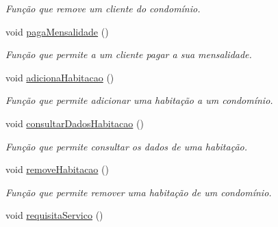 \begin{DoxyCompactItemize}
\begin{DoxyCompactList}\small\item\em Função que remove um cliente do condomínio. \end{DoxyCompactList}\item 
void \hyperlink{class_interface_aaad57b1cee2e56f7468b29522ff26822}{paga\+Mensalidade} ()\hypertarget{class_interface_aaad57b1cee2e56f7468b29522ff26822}{}\label{class_interface_aaad57b1cee2e56f7468b29522ff26822}

\begin{DoxyCompactList}\small\item\em Função que permite a um cliente pagar a sua mensalidade. \end{DoxyCompactList}\item 
void \hyperlink{class_interface_a1cb89458dd7b90cd1b0b52ad429dd898}{adiciona\+Habitacao} ()\hypertarget{class_interface_a1cb89458dd7b90cd1b0b52ad429dd898}{}\label{class_interface_a1cb89458dd7b90cd1b0b52ad429dd898}

\begin{DoxyCompactList}\small\item\em Função que permite adicionar uma habitação a um condomínio. \end{DoxyCompactList}\item 
void \hyperlink{class_interface_a538aebd288ba7ebe79560d7d3263bf1a}{consultar\+Dados\+Habitacao} ()\hypertarget{class_interface_a538aebd288ba7ebe79560d7d3263bf1a}{}\label{class_interface_a538aebd288ba7ebe79560d7d3263bf1a}

\begin{DoxyCompactList}\small\item\em Função que permite consultar os dados de uma habitação. \end{DoxyCompactList}\item 
void \hyperlink{class_interface_a81422a4819d081d4b8d0af9c36e268f3}{remove\+Habitacao} ()\hypertarget{class_interface_a81422a4819d081d4b8d0af9c36e268f3}{}\label{class_interface_a81422a4819d081d4b8d0af9c36e268f3}

\begin{DoxyCompactList}\small\item\em Função que permite remover uma habitação de um condomínio. \end{DoxyCompactList}\item 
void \hyperlink{class_interface_a1cd911a367d92b2ef9a1c2b05fadf5d7}{requisita\+Servico} ()\hypertarget{class_interface_a1cd911a367d92b2ef9a1c2b05fadf5d7}{}\label{class_interface_a1cd911a367d92b2ef9a1c2b05fadf5d7}


\end{DoxyCompactItemize}
